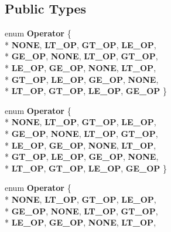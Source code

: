 \subsection*{Public Types}
\begin{DoxyCompactItemize}
\item 
enum {\bfseries Operator} \{ \\*
{\bfseries N\-O\-N\-E}, 
{\bfseries L\-T\-\_\-\-O\-P}, 
{\bfseries G\-T\-\_\-\-O\-P}, 
{\bfseries L\-E\-\_\-\-O\-P}, 
\\*
{\bfseries G\-E\-\_\-\-O\-P}, 
{\bfseries N\-O\-N\-E}, 
{\bfseries L\-T\-\_\-\-O\-P}, 
{\bfseries G\-T\-\_\-\-O\-P}, 
\\*
{\bfseries L\-E\-\_\-\-O\-P}, 
{\bfseries G\-E\-\_\-\-O\-P}, 
{\bfseries N\-O\-N\-E}, 
{\bfseries L\-T\-\_\-\-O\-P}, 
\\*
{\bfseries G\-T\-\_\-\-O\-P}, 
{\bfseries L\-E\-\_\-\-O\-P}, 
{\bfseries G\-E\-\_\-\-O\-P}, 
{\bfseries N\-O\-N\-E}, 
\\*
{\bfseries L\-T\-\_\-\-O\-P}, 
{\bfseries G\-T\-\_\-\-O\-P}, 
{\bfseries L\-E\-\_\-\-O\-P}, 
{\bfseries G\-E\-\_\-\-O\-P}
 \}
\item 
enum {\bfseries Operator} \{ \\*
{\bfseries N\-O\-N\-E}, 
{\bfseries L\-T\-\_\-\-O\-P}, 
{\bfseries G\-T\-\_\-\-O\-P}, 
{\bfseries L\-E\-\_\-\-O\-P}, 
\\*
{\bfseries G\-E\-\_\-\-O\-P}, 
{\bfseries N\-O\-N\-E}, 
{\bfseries L\-T\-\_\-\-O\-P}, 
{\bfseries G\-T\-\_\-\-O\-P}, 
\\*
{\bfseries L\-E\-\_\-\-O\-P}, 
{\bfseries G\-E\-\_\-\-O\-P}, 
{\bfseries N\-O\-N\-E}, 
{\bfseries L\-T\-\_\-\-O\-P}, 
\\*
{\bfseries G\-T\-\_\-\-O\-P}, 
{\bfseries L\-E\-\_\-\-O\-P}, 
{\bfseries G\-E\-\_\-\-O\-P}, 
{\bfseries N\-O\-N\-E}, 
\\*
{\bfseries L\-T\-\_\-\-O\-P}, 
{\bfseries G\-T\-\_\-\-O\-P}, 
{\bfseries L\-E\-\_\-\-O\-P}, 
{\bfseries G\-E\-\_\-\-O\-P}
 \}
\item 
enum {\bfseries Operator} \{ \\*
{\bfseries N\-O\-N\-E}, 
{\bfseries L\-T\-\_\-\-O\-P}, 
{\bfseries G\-T\-\_\-\-O\-P}, 
{\bfseries L\-E\-\_\-\-O\-P}, 
\\*
{\bfseries G\-E\-\_\-\-O\-P}, 
{\bfseries N\-O\-N\-E}, 
{\bfseries L\-T\-\_\-\-O\-P}, 
{\bfseries G\-T\-\_\-\-O\-P}, 
\\*
{\bfseries L\-E\-\_\-\-O\-P}, 
{\bfseries G\-E\-\_\-\-O\-P}, 
{\bfseries N\-O\-N\-E}, 
{\bfseries L\-T\-\_\-\-O\-P}, 

\end{DoxyCompactItemize}

